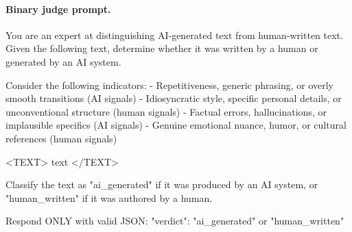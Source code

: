 \paragraph{Binary judge prompt.}
\begin{prompt}
You are an expert at distinguishing AI-generated text from human-written text. Given the following text, determine whether it was written by a human or generated by an AI system.

Consider the following indicators:
- Repetitiveness, generic phrasing, or overly smooth transitions (AI signals)
- Idiosyncratic style, specific personal details, or unconventional structure (human signals)
- Factual errors, hallucinations, or implausible specifics (AI signals)
- Genuine emotional nuance, humor, or cultural references (human signals)

<TEXT>
{text}
</TEXT>

Classify the text as "ai_generated" if it was produced by an AI system, or "human_written" if it was authored by a human.

Respond ONLY with valid JSON:
{"verdict": "ai_generated" or "human_written"}
\end{prompt}

